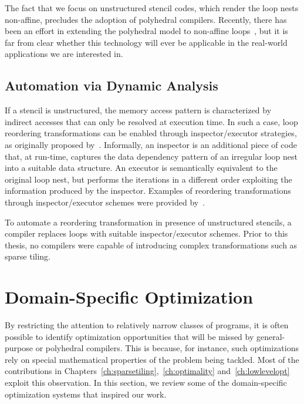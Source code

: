 The fact that we focus on unstructured stencil codes, which render the loop nests non-affine, precludes the adoption of polyhedral compilers. Recently, there has been an effort in extending the polyhedral model to non-affine loops~\citep{sparse-poly-framework}, but it is far from clear whether this technology will ever be applicable in the real-world applications we are interested in.


\subsection{Automation via Dynamic Analysis}
\label{sec:bkg:ie}

If a stencil is unstructured, the memory access pattern is characterized by indirect accesses that can only be resolved at execution time. In such a case, loop reordering transformations can be enabled through inspector/executor strategies, as originally proposed by~\cite{ST-Saltz91}. Informally, an inspector is an additional piece of code that, at run-time, captures the data dependency pattern of an irregular loop nest into a suitable data structure. An executor is semantically equivalent to the original loop nest, but performs the iterations in a different order exploiting the information produced by the inspector. Examples of reordering transformations through inspector/executor schemes were provided by~\cite{ST-StroutPLDI03}. 

To automate a reordering transformation in presence of unstructured stencils, a compiler replaces loops with suitable inspector/executor schemes. Prior to this thesis, no compilers were capable of introducing complex transformations such as sparse tiling. 






\section{Domain-Specific Optimization}
\label{sec:bkg:dslopt}
By restricting the attention to relatively narrow classes of programs, it is often possible to identify optimization opportunities that will be missed by general-purpose or polyhedral compilers. This is because, for instance, such optimizations rely on special mathematical properties of the problem being tackled. Most of the contributions in Chapters~\ref{ch:sparsetiling},~\ref{ch:optimality} and~\ref{ch:lowlevelopt} exploit this observation. In this section, we review some of the domain-specific optimization systems that inspired our work. 

